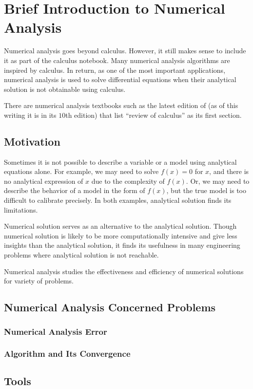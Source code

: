 \chapter{Brief Introduction to Numerical Analysis}

Numerical analysis goes beyond calculus. However, it still makes sense to include it as part of the calculus notebook. Many numerical analysis algorithms are inspired by calculus. In return, as one of the most important applications, numerical analysis is used to solve differential equations when their analytical solution is not obtainable using calculus. 

There are numerical analysis textbooks such as the latest edition of \cite{burden1997numerical} (as of this writing it is in its $10$th edition) that list ``review of calculus'' as its first section.

\section{Motivation}

Sometimes it is not possible to describe a variable or a model using analytical equations alone. For example, we may need to solve $f(x)=0$ for $x$, and there is no analytical expression of $x$ due to the complexity of $f(x)$. Or, we may need to describe the behavior of a model in the form of $f(x)$, but the true model is too difficult to calibrate precisely. In both examples, analytical solution finds its limitations.

Numerical solution serves as an alternative to the analytical solution. Though numerical solution is likely to be more computationally intensive and give less insights than the analytical solution, it finds its usefulness in many engineering problems where analytical solution is not reachable. 

Numerical analysis studies the effectiveness and efficiency of numerical solutions for variety of problems.

\section{Numerical Analysis Concerned Problems}

\subsection{Numerical Analysis Error}

\subsection{Algorithm and Its Convergence}

\section{Tools}

